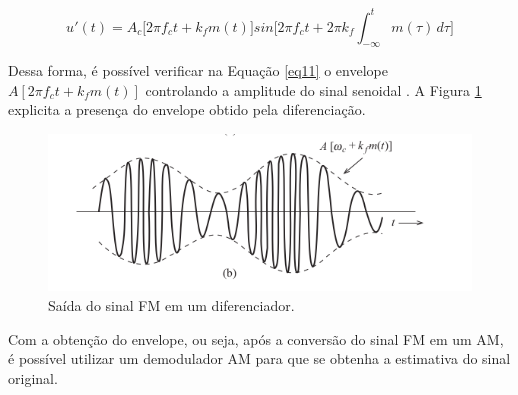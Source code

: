 \begin{equation}
    u'(t) = A_c \bigr[ 2\pi f_ct + k_f m(t) \bigr]
    sin \biggr[ 2\pi f_ct + 2\pi k_f \int_{-\infty}^{t} m(\tau) \,d\tau \biggr]
    \label{eq11}
\end{equation}

Dessa forma, é possível verificar na Equação \ref{eq11} o envelope $A[2\pi f_ct + k_f m(t)]$ controlando a amplitude do sinal senoidal \cite{lathi}. A Figura \ref{fig02} explicita a presença do envelope obtido pela diferenciação. 


\begin{figure}[!htb]
	\centering
	\includegraphics[width=1\linewidth]{Imagens/fig02.png}
	\caption{Saída do sinal FM em um diferenciador.}
	\label{fig02}
\end{figure}

Com a obtenção do envelope, ou seja, após a conversão do sinal FM em um AM, é possível utilizar um demodulador AM para que se obtenha a estimativa do sinal original. 